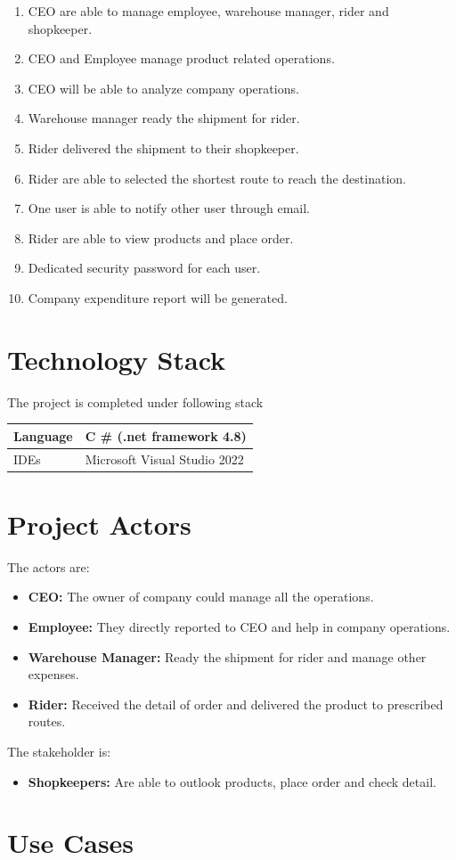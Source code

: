 \documentclass[12pt,a4paper]{report}
\begin{document}
\begin{enumerate}
\item CEO are able to manage employee, warehouse manager, rider and shopkeeper.  
\item CEO and Employee manage product related operations.
\item CEO will be able to analyze company operations.  
\item Warehouse manager ready the shipment for rider. 
\item Rider delivered the shipment to their shopkeeper. 
\item Rider are able to selected the shortest route to reach the destination.  
\item One user is able to notify other user through email.
\item Rider are able to view products and place order. 
\item Dedicated security password for each user. 
\item Company expenditure report will be generated.

\end{enumerate}

\newpage
\chapter {Technology Stack}
The project is completed under following stack \\ 
\begin{tabularx}{0.9\textwidth} { 
  | >{\raggedright\arraybackslash}X 
  | >{\centering\arraybackslash}X |
  }
  \hline
 Language & C \# (.net framework 4.8)   \\
 \hline
IDEs  & Microsoft Visual Studio 2022  \\
\hline
\end{tabularx}
\newpage
\chapter {Project Actors}
The actors are:
\begin{itemize}
\item \textbf{ CEO:} The owner of company could manage all the operations.
\item \textbf{Employee:} They directly reported to CEO and help in company operations.    
\item \textbf{Warehouse Manager:} Ready the shipment for rider and manage other expenses. 
\item \textbf{Rider:} Received the detail of order and delivered the product to prescribed routes.  
\end{itemize}
The stakeholder is:
\begin{itemize}
\item \textbf{Shopkeepers:} Are able to outlook products, place order and check detail.
\end{itemize}
\newpage
\chapter {Use Cases}
\end{document}
